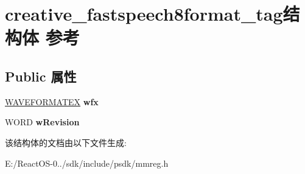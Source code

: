 \hypertarget{structcreative__fastspeech8format__tag}{}\section{creative\+\_\+fastspeech8format\+\_\+tag结构体 参考}
\label{structcreative__fastspeech8format__tag}
\subsection*{Public 属性}
\begin{DoxyCompactItemize}
\item 
\mbox{\label{structcreative__fastspeech8format__tag_a5452e0c5b2d6ca89b78d8b2d75ef3e01}} 
\hyperlink{struct_w_a_v_e_f_o_r_m_a_t_e_x}{W\+A\+V\+E\+F\+O\+R\+M\+A\+T\+EX} {\bfseries wfx}
\item 
\mbox{\label{structcreative__fastspeech8format__tag_a8cafe2edc0dd5263c6a49fcf72e6231f}} 
W\+O\+RD {\bfseries w\+Revision}
\end{DoxyCompactItemize}


该结构体的文档由以下文件生成\+:\begin{DoxyCompactItemize}
\item 
E\+:/\+React\+O\+S-\/0../sdk/include/psdk/mmreg.\+h\end{DoxyCompactItemize}
